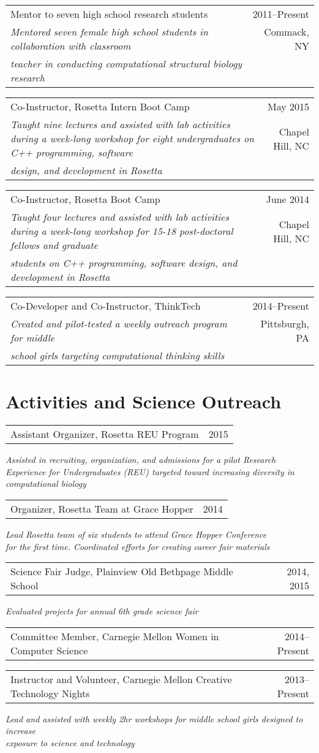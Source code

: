 \documentclass[12pt]{article}
\makeatletter
\newcommand{\allcapsspacing}[1]{{\addfontfeature{LetterSpace=7.5}#1}}
\newcommand{\threerowstwocolsitem}[5]{
\noindent
\begin{tabular*}{\textwidth}{@{\extracolsep{\fill}}lr}
		#1 & #2 \\
		#3 & #4 \\
		#5 & \\
\end{tabular*}\vspace{0.75\baselineskip}}
\newcommand{\longteachingitem}[5]{
\threerowstwocolsitem{#1}{#2}{\textit{#3}}{#5}{\textit{#4}}}
\newcommand{\leadershipitem}[3]{
\noindent
\begin{tabular*}{\textwidth}{@{\extracolsep{\fill}}lr}
		#1 & #2 \\
\end{tabular*}\newline\textit{#3}\vspace{0.75\baselineskip}\par}
\newcommand{\yearitem}[2]{
\noindent
\begin{tabular*}{\textwidth}{@{\extracolsep{\fill}}lr}
		#1 & #2 \\
\end{tabular*}\vspace{0.75\baselineskip}\par}
\makeatother
\begin{document}
\longteachingitem{Mentor to seven high school research students}{2011--Present}{Mentored seven female high school students in collaboration with classroom}{teacher in conducting computational structural biology research}{Commack, NY}

\longteachingitem{Co-Instructor, Rosetta Intern Boot Camp}{May 2015}{Taught nine lectures and assisted with lab activities during a week-long workshop for eight undergraduates on C++ programming, software }{design, and development in Rosetta}{Chapel Hill, NC}

\longteachingitem{Co-Instructor, Rosetta Boot Camp}{June 2014}{Taught four lectures and assisted with lab activities during a week-long workshop for 15-18 post-doctoral fellows and graduate}{students on C++ programming, software design, and development in Rosetta}{Chapel Hill, NC}

\longteachingitem{Co-Developer and Co-Instructor, ThinkTech}{2014--Present}{Created and pilot-tested a weekly outreach program for middle}{school girls targeting computational thinking skills}{Pittsburgh, PA}

\section*{\allcapsspacing{Activities and Science Outreach}}
\leadershipitem{Assistant Organizer, Rosetta REU Program}{2015}{Assisted in recruiting, organization, and admissions for a pilot Research \\ Experience for Undergraduates (REU) targeted toward increasing diversity in computational biology}

\leadershipitem{Organizer, Rosetta Team at Grace Hopper}{2014}{Lead Rosetta team of six students to attend Grace Hopper Conference \\ for the first time. Coordinated efforts for creating career fair materials}

\leadershipitem{Science Fair Judge, Plainview Old Bethpage Middle School}{2014, 2015}{Evaluated projects for annual 6th grade science fair}

\yearitem{Committee Member, Carnegie Mellon Women in Computer Science}{2014--Present}

\leadershipitem{Instructor and Volunteer, Carnegie Mellon Creative Technology Nights}{2013--Present}{Lead and assisted with weekly 2hr workshops for middle school girls designed to increase \\ exposure to science and technology}
\end{document}
